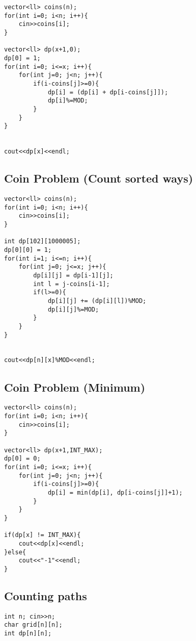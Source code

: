 \documentclass[10pt]{article}
\begin{document}
\begin{multicols*}{2}
\begin{lstlisting}[style=compactcpp]
vector<ll> coins(n);
for(int i=0; i<n; i++){
    cin>>coins[i];
}
    
vector<ll> dp(x+1,0);
dp[0] = 1;
for(int i=0; i<=x; i++){
    for(int j=0; j<n; j++){
        if(i-coins[j]>=0){
            dp[i] = (dp[i] + dp[i-coins[j]]);
            dp[i]%=MOD;
        }
    }
}
        
        
cout<<dp[x]<<endl;
\end{lstlisting}

\subsection{Coin Problem (Count sorted ways)}

\begin{lstlisting}[style=compactcpp]
vector<ll> coins(n);
for(int i=0; i<n; i++){
    cin>>coins[i];
}
    
int dp[102][1000005];
dp[0][0] = 1;
for(int i=1; i<=n; i++){
    for(int j=0; j<=x; j++){
        dp[i][j] = dp[i-1][j];
        int l = j-coins[i-1];
        if(l>=0){
            dp[i][j] += (dp[i][l])%MOD;
            dp[i][j]%=MOD;
        }
    }
}
        
        
cout<<dp[n][x]%MOD<<endl;
\end{lstlisting}

\subsection{Coin Problem (Minimum)}

\begin{lstlisting}[style=compactcpp]
vector<ll> coins(n);
for(int i=0; i<n; i++){
    cin>>coins[i];
}
    
vector<ll> dp(x+1,INT_MAX);
dp[0] = 0;
for(int i=0; i<=x; i++){
    for(int j=0; j<n; j++){
        if(i-coins[j]>=0){
            dp[i] = min(dp[i], dp[i-coins[j]]+1);
        }
    }
}
    
if(dp[x] != INT_MAX){
    cout<<dp[x]<<endl;
}else{
    cout<<"-1"<<endl;
}
\end{lstlisting}

\subsection{Counting paths}

\begin{lstlisting}[style=compactcpp]
int n; cin>>n;
char grid[n][n];
int dp[n][n];
    

\end{lstlisting}
\end{multicols*}
\end{document}
